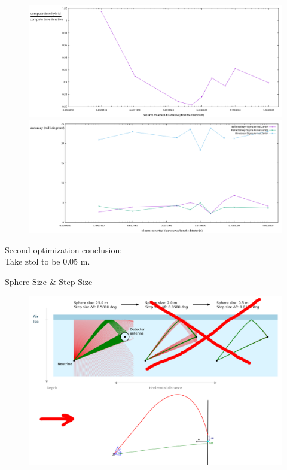 \documentclass{beamer}
\begin{document}
\begin{frame}
	\begin{figure}
		\begin{minipage}{\textwidth}
			\centering
			\includegraphics[height=0.45\textheight]{figures/ZtolVsTime2.pdf}
		\end{minipage}
		\begin{minipage}{\textwidth}
			\centering
			\includegraphics[height=0.45\textheight]{figures/ZtolVsSigmaAZ.pdf}
		\end{minipage}
	\end{figure}
\end{frame}
\begin{frame}
	Second optimization conclusion:\\ Take ztol to be 0.05 m.
\end{frame}
\begin{frame}{Sphere Size \& Step Size}
	\begin{figure}
		\includegraphics[width=\textwidth]{figures/FullHybridIllu.png}
	\end{figure}
\end{frame}
\end{document}
